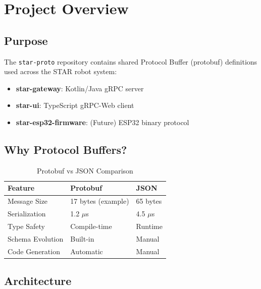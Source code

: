 \section{Project Overview}

\subsection{Purpose}

The \texttt{star-proto} repository contains shared Protocol Buffer (protobuf) definitions used across the STAR robot system:

\begin{itemize}
    \item \textbf{star-gateway}: Kotlin/Java gRPC server
    \item \textbf{star-ui}: TypeScript gRPC-Web client
    \item \textbf{star-esp32-firmware}: (Future) ESP32 binary protocol
\end{itemize}

\subsection{Why Protocol Buffers?}

\begin{table}[H]
\centering
\begin{tabular}{|l|l|l|}
\hline
\textbf{Feature} & \textbf{Protobuf} & \textbf{JSON} \\
\hline
Message Size & 17 bytes (example) & 65 bytes \\
Serialization & 1.2 $\mu$s & 4.5 $\mu$s \\
Type Safety & Compile-time & Runtime \\
Schema Evolution & Built-in & Manual \\
Code Generation & Automatic & Manual \\
\hline
\end{tabular}
\caption{Protobuf vs JSON Comparison}
\end{table}

\subsection{Architecture}

